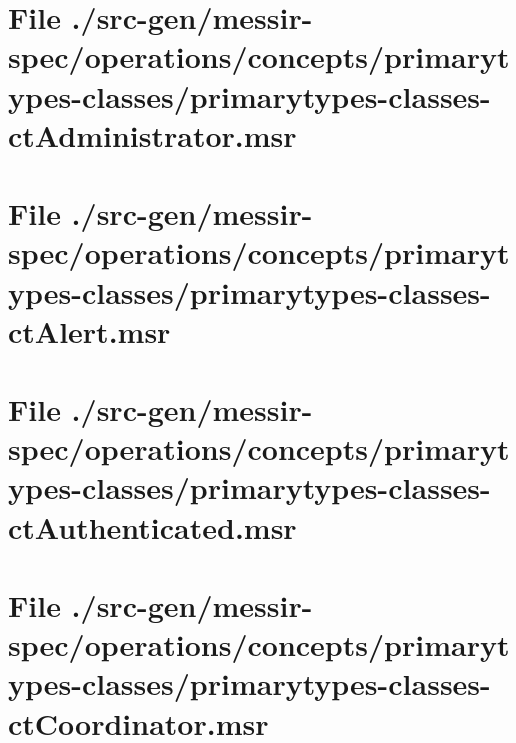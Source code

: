 \section[File /src-gen/messir-spec.../primarytypes-classes-ctAdministrator.msr]{File ./src-gen/messir-spec/operations/concepts/primarytypes-classes/primarytypes-classes-ctAdministrator.msr}
\scriptsize

\normalsize
	
\section[File /src-gen/messir-spec/operations.../primarytypes-classes-ctAlert.msr]{File ./src-gen/messir-spec/operations/concepts/primarytypes-classes/primarytypes-classes-ctAlert.msr}
\scriptsize

\normalsize
	
\section[File /src-gen/messir-spec.../primarytypes-classes-ctAuthenticated.msr]{File ./src-gen/messir-spec/operations/concepts/primarytypes-classes/primarytypes-classes-ctAuthenticated.msr}
\scriptsize

\normalsize
	
\section[File /src-gen/messir-spec/operations.../primarytypes-classes-ctCoordinator.msr]{File ./src-gen/messir-spec/operations/concepts/primarytypes-classes/primarytypes-classes-ctCoordinator.msr}
\scriptsize

\normalsize
	
